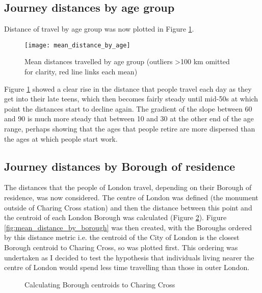 \subsection{Journey distances by age group}
\label{sec:journey_distances_by_age_group}

Distance of travel by age group was now plotted in Figure \ref{fig:mean_distance_by_age}.

\begin{landscape}

\begin{figure}[H]
\centering
\texttt{[image: mean\_distance\_by\_age]}
\caption{Mean distances travelled by age group (outliers \textgreater 100 km omitted for clarity, red line links each mean)}
\label{fig:mean_distance_by_age}
\end{figure}

\end{landscape}

Figure \ref{fig:mean_distance_by_age} showed a clear rise in the distance that people travel each day as they get into their late teens, which then becomes fairly steady until mid-50s at which point the distances start to decline again. The gradient of the slope between 60 and 90 is much more steady that between 10 and 30 at the other end of the age range, perhaps showing that the ages that people retire are more dispersed than the ages at which people start work.

\subsection{Journey distances by Borough of residence}
\label{sec:journey_distances_by_borough_of_residence}

The distances that the people of London travel, depending on their Borough of residence, was now considered. The centre of London was defined (the monument outside of Charing Cross station) and then the distance between this point and the centroid of each London Borough was calculated (Figure \ref{fig:borough_centroids}). Figure \ref{fig:mean_distance_by_borough} was then created, with the Boroughs ordered by this distance metric i.e. the centroid of the City of London is the closest Borough centroid to Charing Cross, so was plotted first. This ordering was undertaken as I decided to test the hypothesis that individuals living nearer the centre of London would spend less time travelling than those in outer London.

\begin{figure}[H]
\centering
{}
\caption{Calculating Borough centroids to Charing Cross}
\label{fig:borough_centroids}
\end{figure}

